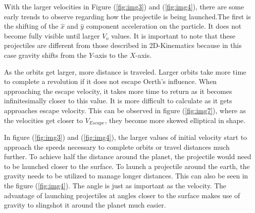 \documentclass[12pt]{extarticle}
\begin{document}
With the larger velocities in Figure (\ref{fig:img3}) and (\ref{fig:img4}), there are some early trends to observe regarding how the projectile is being launched.The first is the shifting of the $\hat{x}$ and $\hat{y}$ component acceleration on the particle. It does not become fully visible until larger $V_o$ values. It is important to note that these projectiles are different from those described in 2D-Kinematics because in this case gravity shifts from the $Y$-axis to the $X$-axis.


As the orbits get larger, more distance is traveled. Larger orbits take more time to complete a revolution if it does not escape Oerth's influence. When approaching the escape velocity, it takes more time to return as it becomes infinitesimally closer to this value. It is more difficult to calculate as it gets approaches escape velocity. This can be observed in figure (\ref{fig:img7}), where as the velocities get closer to $V_{Escape}$, they become more skewed elliptical in shape.

In figure (\ref{fig:img3}) and (\ref{fig:img4}), the larger values of initial velocity start to approach the speeds necessary to complete orbits or travel distances much further. To achieve half the distance around the planet, the projectile would need to be launched closer to the surface. To launch a projectile around the earth, the gravity needs to be utilized to manage longer distances. This can also be seen in the figure (\ref{fig:img4}). The angle is just as important as the velocity. The advantage of launching projectiles at angles closer to the surface makes use of gravity to slingshot it around the planet much easier. 
\end{document}
